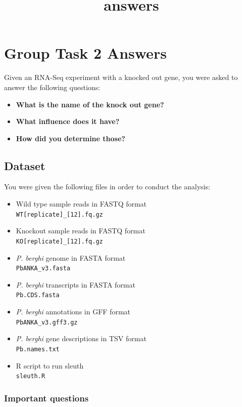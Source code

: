 \documentclass[11pt]{article}
\title{answers}
\begin{document}
    \section{Group Task 2 Answers}\label{group-task-2-answers}

Given an RNA-Seq experiment with a knocked out gene, you were asked to
answer the following questions:

\begin{itemize}
\item
  \textbf{What is the name of the knock out gene?}
\item
  \textbf{What influence does it have?}
\item
  \textbf{How did you determine those?}
\end{itemize}

    \subsection{Dataset}\label{dataset}

You were given the following files in order to conduct the analysis:

\begin{itemize}
\item
  Wild type sample reads in FASTQ format\\
  \texttt{WT{[}replicate{]}\_{[}1\textbar{}2{]}.fq.gz}
\item
  Knockout sample reads in FASTQ format\\
  \texttt{KO{[}replicate{]}\_{[}1\textbar{}2{]}.fq.gz}
\item
  \textit{P. berghi} genome in FASTA format\\
  \texttt{PbANKA\_v3.fasta}
\item
  \textit{P. berghi} transcripts in FASTA format\\
  \texttt{Pb.CDS.fasta}
\item
  \textit{P. berghi} annotations in GFF format\\
  \texttt{PbANKA\_v3.gff3.gz}
\item
  \textit{P. berghi} gene descriptions in TSV format\\
  \texttt{Pb.names.txt}
\item
  R script to run sleuth\\
  \texttt{sleuth.R}
\end{itemize}

\newpage

\subsubsection{Important questions}\label{important-questions}
\end{document}

